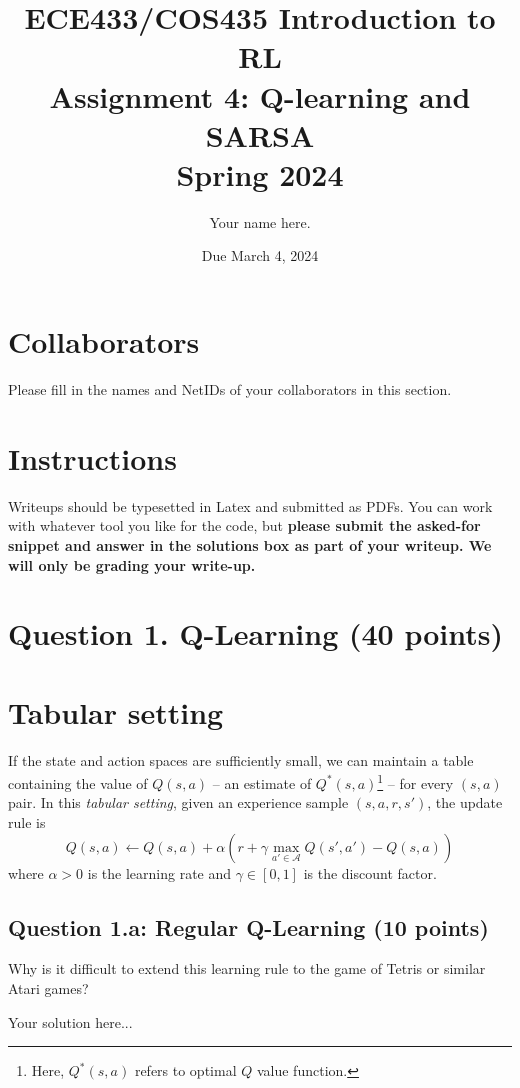 \documentclass[12pt]{article}
\date{Due March 4, 2024}
\author{\begin{fillme}[width=0.3\textwidth]
 Your name here.
\end{fillme}} %
\title{ECE433/COS435 Introduction to RL\\
  Assignment 4: Q-learning and SARSA
\\
  Spring 2024\\
}
\begin{document}
  \maketitle
  \section*{Collaborators}
\begin{fillme}
 Please fill in the names and NetIDs of your collaborators in this section.
\end{fillme}

\section*{Instructions}

Writeups should be typesetted in Latex and submitted as PDFs. You can work with whatever tool you like for the code, but \textbf{please submit the asked-for snippet and answer in the solutions box as part of your writeup. We will only be grading your write-up.}

\section*{Question 1. Q-Learning (40 points)}
\section*{Tabular setting}
If the state and action spaces are sufficiently small, we can maintain a table containing the value of $Q(s,a)$ -- an estimate of $Q^*(s,a)$\footnote{Here, $Q^*(s,a)$ refers to optimal $Q$ value function.} -- for every $(s,a)$ pair. In this \textit{tabular setting}, given an experience sample $(s,a,r,s')$, the update rule is
\begin{equation} \label{q-learning-update}
Q(s,a) \leftarrow Q(s,a) + \alpha \left( r + \gamma \max_{a' \in \mathcal{A}} Q(s',a') - Q(s,a) \right)
\end{equation}
where $\alpha > 0$ is the learning rate and $\gamma \in [0, 1]$ is the discount factor.

\subsection*{Question 1.a: Regular Q-Learning (10 points)} 
Why is it difficult to extend this learning rule to the game of Tetris or similar Atari games?
\begin{solution}
Your solution here...
\end{solution}
\end{document}
